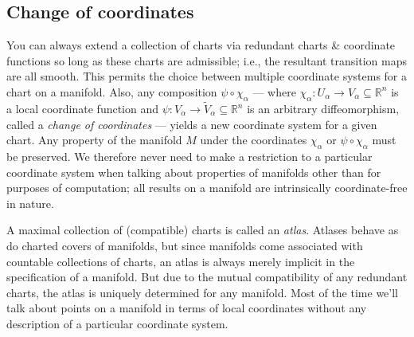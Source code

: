 \documentclass[a4paper]{article}
\newcommand{\R}{\mathbb{R}}
\begin{document}
\subsection{Change of coordinates}

You can always extend a collection of charts via redundant charts \& coordinate functions so long as these charts are admissible; i.e., the resultant transition maps are all smooth. This permits the choice between multiple coordinate systems for a chart on a manifold. Also, any composition $\psi \circ \chi_\alpha$ --- where $\chi_\alpha : U_\alpha \to V_\alpha \subseteq \R^n$ is a local coordinate function and $\psi : V_\alpha \to \tilde{V}_\alpha \subseteq \R^n$ is an arbitrary diffeomorphism, called a \emph{change of coordinates} --- yields a new coordinate system for a given chart. Any property of the manifold $M$ under the coordinates $\chi_\alpha$ or $\psi \circ \chi_\alpha$ must be preserved. We therefore never need to make a restriction to a particular coordinate system when talking about properties of manifolds other than for purposes of computation; all results on a manifold are intrinsically coordinate-free in nature.

A maximal collection of (compatible) charts is called an \emph{atlas}. Atlases behave as do charted covers of manifolds, but since manifolds come associated with countable collections of charts, an atlas is always merely implicit in the specification of a manifold. But due to the mutual compatibility of any redundant charts, the atlas is uniquely determined for any manifold. Most of the time we'll talk about points on a manifold in terms of local coordinates without any description of a particular coordinate system.
\end{document}
